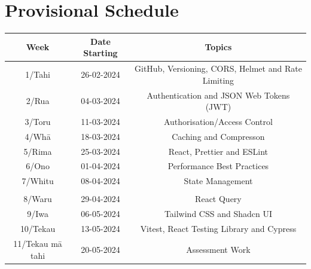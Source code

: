 \documentclass{article}
\begin{document}
\section*{Provisional Schedule}
\renewcommand{\arraystretch}{1.5} 
\begin{tabular}{|c|c|c|c|}
	\hline
	\textbf{Week}                  & \textbf{Date Starting}            & \multicolumn{2}{c|}{\textbf{Topics}}                                                                                             \\ \hline
	1/Tahi           & 26-02-2024 & \multicolumn{2}{c|}{GitHub, Versioning, CORS, Helmet and Rate Limiting}    \\ \hline
	2/Rua            & 04-03-2024 & \multicolumn{2}{c|}{Authentication and JSON Web Tokens (JWT)}                   \\ \hline
	3/Toru           & 11-03-2024 & \multicolumn{2}{c|}{Authorisation/Access Control} \\ \hline
	4/Whā            & 18-03-2024 & \multicolumn{2}{c|}{Caching and Compresson}                               \\ \hline
	5/Rima           & 25-03-2024 & \multicolumn{2}{c|}{React, Prettier and ESLint}                                                \\ \hline
	6/Ono            & 01-04-2024  & \multicolumn{2}{c|}{Performance Best Practices}                                                   \\ \hline
	7/Whitu          & 08-04-2024 &  \multicolumn{2}{c|}{State Management}                            \\ \hline
	\rowcolor{yellow} \multicolumn{4}{|c|}{Mid Term Break}                                                                                                                         \\ \hline
	8/Waru   & 29-04-2024 & \multicolumn{2}{c|}{React Query}                                                   \\ \hline
	9/Iwa            & 06-05-2024 & \multicolumn{2}{c|}{Tailwind CSS and Shadcn UI}                                                                 \\ \hline
	10/Tekau         & 13-05-2024 & \multicolumn{2}{c|}{Vitest, React Testing Library and Cypress}                                                                 \\ \hline
	11/Tekau mā tahi & 20-05-2024 & \multicolumn{2}{c|}{Assessment Work}                                                                 \\ \hline

\end{tabular}
\end{document}
